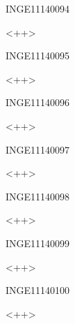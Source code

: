\documentclass{article}
\begin{document}
\begin{corrige}{INGE11140094}

<++>

\end{corrige}%


\begin{corrige}{INGE11140095}

<++>

\end{corrige}%


\begin{corrige}{INGE11140096}

<++>

\end{corrige}%


\begin{corrige}{INGE11140097}

<++>

\end{corrige}%


\begin{corrige}{INGE11140098}

<++>

\end{corrige}%


\begin{corrige}{INGE11140099}

<++>

\end{corrige}%


\begin{corrige}{INGE11140100}

<++>

\end{corrige}%
\end{document}
